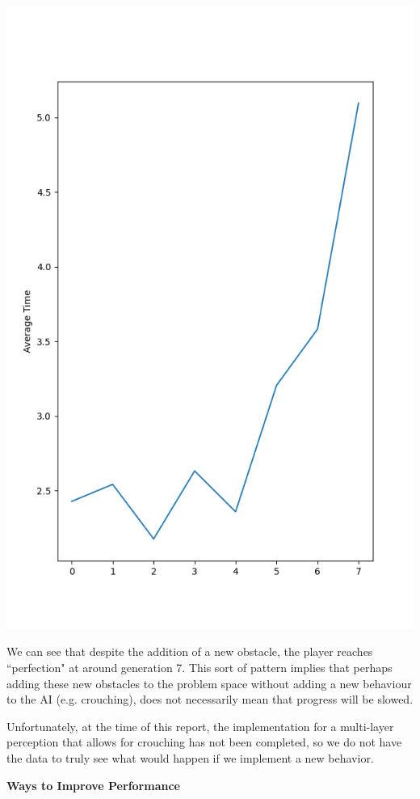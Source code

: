 \documentclass[12pt]{article}
\begin{document}
\begin{flushleft}
\includegraphics[scale=.4]{Figure_5.png}

We can see that despite the addition of a new obstacle, the player reaches ``perfection" at around generation 7. This sort of pattern implies that perhaps adding these new obstacles to the problem space without adding a new behaviour to the AI (e.g. crouching), does not necessarily mean that progress will be slowed.

Unfortunately, at the time of this report, the implementation for a multi-layer perception that allows for crouching has not been completed, so we do not have the data to truly see what would happen if we implement a new behavior.

\hfill

\noindent\textbf{Ways to Improve Performance}


\end{flushleft}
\end{document}
